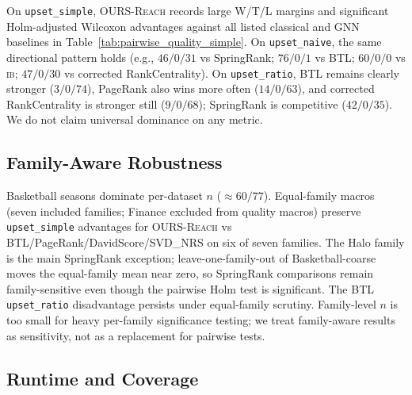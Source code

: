\documentclass{article}
\begin{document}
On \texttt{upset\_simple}, \textsc{OURS-Reach} records large W/T/L margins and significant Holm-adjusted Wilcoxon advantages against all listed classical and GNN baselines in Table~\ref{tab:pairwise_quality_simple}.
On \texttt{upset\_naive}, the same directional pattern holds (e.g., $46/0/31$ vs SpringRank; $76/0/1$ vs BTL; $60/0/0$ vs \textsc{ib}; $47/0/30$ vs corrected RankCentrality).
On \texttt{upset\_ratio}, BTL remains clearly stronger ($3/0/74$), PageRank also wins more often ($14/0/63$), and corrected RankCentrality is stronger still ($9/0/68$); SpringRank is competitive ($42/0/35$).
We do not claim universal dominance on any metric.

\subsection{Family-Aware Robustness}
\label{subsec:family_aware}

Basketball seasons dominate per-dataset $n$ ($\approx 60/77$).
Equal-family macros (seven included families; Finance excluded from quality macros) preserve \texttt{upset\_simple} advantages for \textsc{OURS-Reach} vs BTL/PageRank/DavidScore/SVD\_NRS on six of seven families.
The Halo family is the main SpringRank exception; leave-one-family-out of Basketball-coarse moves the equal-family mean near zero, so SpringRank comparisons remain family-sensitive even though the pairwise Holm test is significant.
The BTL \texttt{upset\_ratio} disadvantage persists under equal-family scrutiny.
Family-level $n$ is too small for heavy per-family significance testing; we treat family-aware results as sensitivity, not as a replacement for pairwise tests.

\subsection{Runtime and Coverage}
\label{subsec:runtime_coverage}
\end{document}
